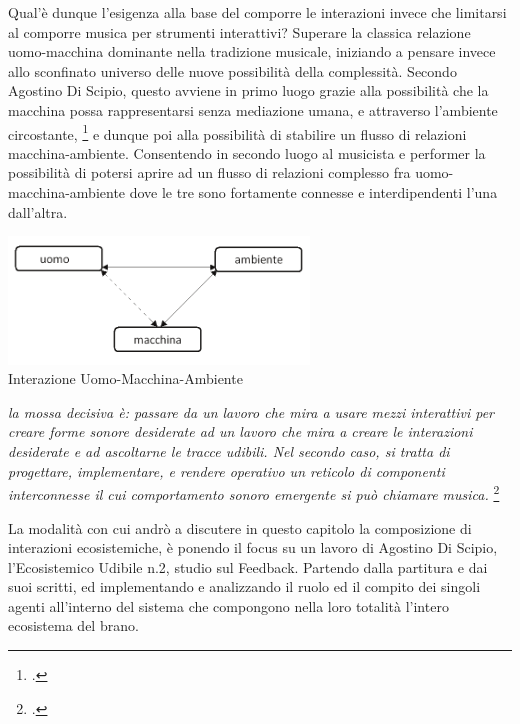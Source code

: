 Qual'è dunque l'esigenza alla base del comporre le interazioni invece 
che limitarsi al comporre musica per strumenti interattivi? 
Superare la classica relazione uomo-macchina dominante nella tradizione musicale, 
iniziando a pensare invece allo sconfinato universo delle nuove possibilità della complessità.
Secondo Agostino Di Scipio, questo avviene in primo luogo grazie 
alla possibilità che la macchina possa rappresentarsi
senza mediazione umana, e attraverso l'ambiente circostante, \footcite{discipio_polverisonore_2016}
e dunque poi alla possibilità di stabilire un flusso di relazioni macchina-ambiente. 
Consentendo in secondo luogo al musicista e performer 
la possibilità di potersi aprire ad un flusso di relazioni 
complesso fra uomo-macchina-ambiente dove le tre sono fortamente connesse e interdipendenti 
l'una dall'altra.

\begin{center}
\vspace{0.5cm}
\includegraphics[width=8cm]{figures/uomo_macchina_ambiente.png} \\
{Interazione Uomo-Macchina-Ambiente} \\ 
\vspace{0.5cm}
\end{center}

\begin{center}
\vspace{0.5cm}
\textit{la mossa decisiva è: passare da un lavoro che mira a usare mezzi interattivi per creare forme sonore desiderate ad
un lavoro che mira a creare le interazioni desiderate e ad ascoltarne le tracce udibili. Nel secondo caso, si tratta
di progettare, implementare, e rendere operativo un reticolo di componenti interconnesse il cui comportamento
sonoro emergente si può chiamare musica.} \footcite{discipio_polverisonore_2016}
\vspace{0.5cm}
\end{center}

La modalità con cui andrò a discutere in questo capitolo la composizione di interazioni ecosistemiche, 
è ponendo il focus su un lavoro di Agostino Di Scipio, l’Ecosistemico Udibile n.2, studio sul Feedback. 
Partendo dalla partitura e dai suoi scritti, ed implementando e analizzando
il ruolo ed il compito dei singoli agenti all'interno del sistema 
che compongono nella loro totalità l'intero ecosistema del brano. 

